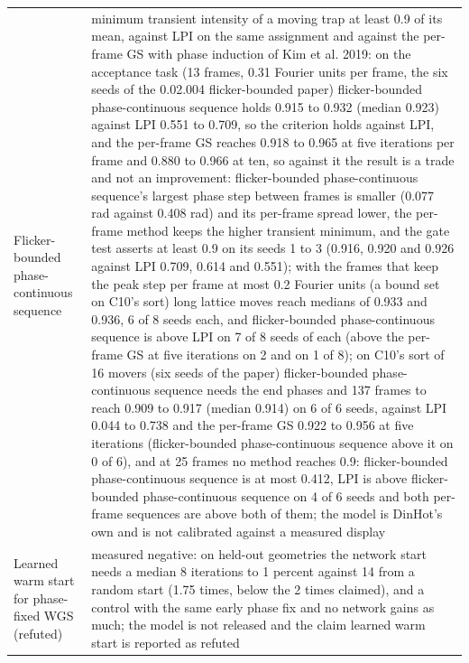 \begin{longtable}{@{}>{\raggedright\arraybackslash}p{} >{\raggedright\arraybackslash}p{}@{}}
Flicker-bounded phase-continuous sequence & \footnotesize minimum transient intensity of a moving trap at least 0.9 of its mean, against LPI on the same assignment and against the per-frame GS with phase induction of Kim et al. 2019: on the acceptance task (13 frames, 0.31 Fourier units per frame, the six seeds of the 0.02.004 flicker-bounded paper) flicker-bounded phase-continuous sequence holds 0.915 to 0.932 (median 0.923) against LPI 0.551 to 0.709, so the criterion holds against LPI, and the per-frame GS reaches 0.918 to 0.965 at five iterations per frame and 0.880 to 0.966 at ten, so against it the result is a trade and not an improvement: flicker-bounded phase-continuous sequence's largest phase step between frames is smaller (0.077 rad against 0.408 rad) and its per-frame spread lower, the per-frame method keeps the higher transient minimum, and the gate test asserts at least 0.9 on its seeds 1 to 3 (0.916, 0.920 and 0.926 against LPI 0.709, 0.614 and 0.551); with the frames that keep the peak step per frame at most 0.2 Fourier units (a bound set on C10's sort) long lattice moves reach medians of 0.933 and 0.936, 6 of 8 seeds each, and flicker-bounded phase-continuous sequence is above LPI on 7 of 8 seeds of each (above the per-frame GS at five iterations on 2 and on 1 of 8); on C10's sort of 16 movers (six seeds of the paper) flicker-bounded phase-continuous sequence needs the end phases and 137 frames to reach 0.909 to 0.917 (median 0.914) on 6 of 6 seeds, against LPI 0.044 to 0.738 and the per-frame GS 0.922 to 0.956 at five iterations (flicker-bounded phase-continuous sequence above it on 0 of 6), and at 25 frames no method reaches 0.9: flicker-bounded phase-continuous sequence is at most 0.412, LPI is above flicker-bounded phase-continuous sequence on 4 of 6 seeds and both per-frame sequences are above both of them; the model is DinHot's own and is not calibrated against a measured display\\
Learned warm start for phase-fixed WGS (refuted) & \footnotesize measured negative: on held-out geometries the network start needs a median 8 iterations to 1 percent against 14 from a random start (1.75 times, below the 2 times claimed), and a control with the same early phase fix and no network gains as much; the model is not released and the claim learned warm start is reported as refuted\\

\end{longtable}
